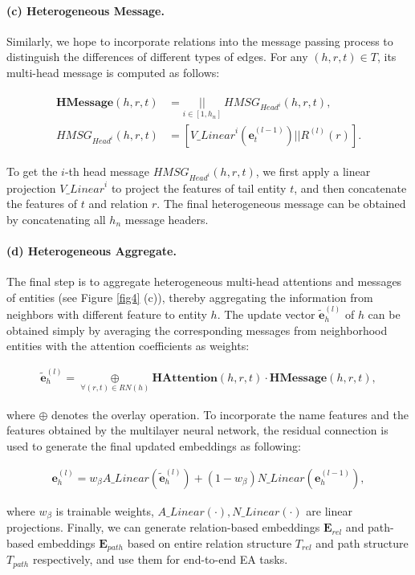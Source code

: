 \documentclass{article}
\begin{document}
\paragraph{(c) Heterogeneous Message.}
Similarly, we hope to incorporate relations into the message passing process to distinguish the differences of different types of edges.
For any $(h, r, t) \in T$, its multi-head message is computed as follows:
\begin{small}
	\begin{align}
	\begin{split}
	\mathbf{HMessage}(h, r, t) &= \underset{i \in [1,h_n]}{||} \ HMSG_{Head^{i}}(h, r, t),
	\\
	HMSG_{Head^{i}}(h, r, t) &= [{V\_Linear}^i (\mathbf{e}^{(l-1)}_{t}) || R^{(l)}(r)].
	\end{split}
	\end{align}
\end{small}To 
get the $i$-th head message $HMSG_{Head^{i}}(h, r, t)$, we first apply a linear projection ${V\_Linear}^i$ to project the features of tail entity $t$, and then concatenate the features of $t$ and relation $r$.
The final heterogeneous message can be obtained by concatenating all $h_n$ message headers.

\paragraph{(d) Heterogeneous Aggregate.}
The final step is to aggregate heterogeneous multi-head attentions and messages of entities (see Figure \ref{fig4} (c)), thereby aggregating the information from neighbors with different feature to entity $h$.
The update vector $\tilde{\mathbf{e}}^{(l)}_{h}$ of $h$ can be obtained simply by averaging the corresponding messages from neighborhood entities with the attention coefficients as weights:
\begin{small}
	\begin{align}
	\tilde{\mathbf{e}}^{(l)}_{h} \!=\! 
	\underset{\forall (r,t) \in\! RN(h)}{\oplus} \mathbf{HAttention}(h, \!r,\! t) \!\cdot\! \mathbf{HMessage}(h, \!r, \!t) ,
	\end{align}
\end{small}where
$\oplus$ denotes the overlay operation.
To incorporate the name features and the features obtained by the multilayer neural network, the residual connection is used to generate the final updated embeddings as following: %
\begin{small}
	\begin{align}
	\mathbf{e}^{(l)}_{h} = w_{\beta } {A\_Linear}(\tilde{\mathbf{e}}^{(l)}_{h}) + (1- w_{\beta }) {N\_Linear}(\mathbf{e}^{(l-1)}_{h}),
	\end{align}
\end{small}where
$w_{\beta }$ is trainable weights,
$A\_Linear(\cdot),N\_Linear(\cdot)$ are linear projections.
Finally, we can generate relation-based embeddings $\mathbf{E}_{rel}$ and path-based embeddings $\mathbf{E}_{path}$ based on entire relation structure $T_{rel}$ and path structure $T_{path}$ respectively, and use them for end-to-end EA tasks.
\end{document}
